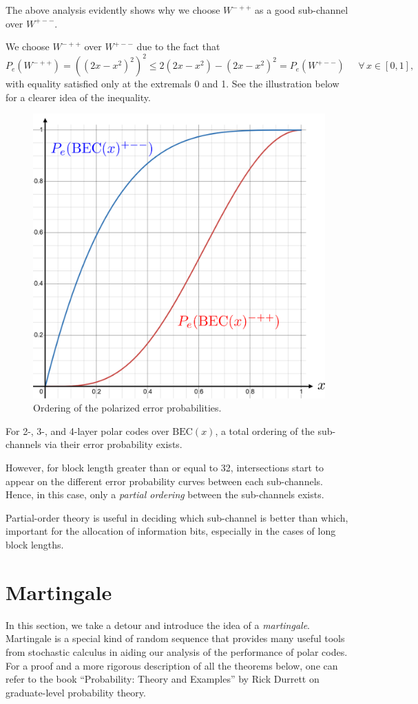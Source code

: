 The above analysis evidently shows why we choose $W^{-++}$ as a good sub-channel over $W^{+--}$.
\begin{remark}
    We choose $W^{-++}$ over $W^{+--}$ due to the fact that
    \begin{equation}
        P_e(W^{-++}) = \left((2x-x^2)^2\right)^2 \le 2(2x-x^2) - (2x-x^2)^2 = P_e(W^{+--})\;\;\;\;\;\forall\, x\in[0,1],
    \end{equation}
    with equality satisfied only at the extremals 0 and 1. See the illustration below for a clearer idea of the inequality.
    \begin{figure}[H]
        \centering
        \includegraphics[width=0.35\linewidth]{figures/w3_partial_order.png}
        \caption{Ordering of the polarized error probabilities.}
    \end{figure}

    For 2-, 3-, and 4-layer polar codes over $\mathrm{BEC}(x)$, a total ordering of the sub-channels via their error probability exists.

    However, for block length greater than or equal to 32, intersections start to appear on the different error probability curves between each sub-channels. Hence, in this case, only a \textit{partial ordering} between the sub-channels exists.

    Partial-order theory is useful in deciding which sub-channel is better than which, important for the allocation of information bits, especially in the cases of long block lengths.
\end{remark}



\section{Martingale}
In this section, we take a detour and introduce the idea of a \textit{martingale}. Martingale is a special kind of random sequence that provides many useful tools from stochastic calculus in aiding our analysis of the performance of polar codes. For a proof and a more rigorous description of all the theorems below, one can refer to the book ``Probability: Theory and Examples'' \cite{Durrett} by Rick Durrett on graduate-level probability theory.


